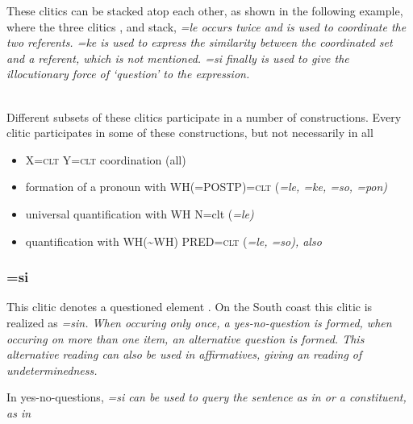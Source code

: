 These clitics can be stacked atop each other, as shown in the following example, where the three  clitics ,  and  stack, \em =le \em occurs twice and is used to coordinate the two referents. \em =ke \em is used to express the similarity between the coordinated set and a referent, which is not mentioned. \em =si \em finally is used to give the illocutionary force of `question' to the expression. 


 \\
Different subsets of these clitics participate in a number of constructions. Every clitic participates in some of these constructions, but not necessarily in all

\begin{itemize}\label{page:list:morph:clt}
 \item  X=\textsc{clt} Y=\textsc{clt} coordination (all)
 \item formation of a pronoun with WH(=POSTP)=\textsc{clt} (\em =le, =ke, =so, =pon\em) 
\item  universal quantification with WH N=clt (\em =le\em)  
 \item  quantification with WH(\~{}WH) PRED=\textsc{clt} (\em =le, =so\em), also 
\end{itemize}


\subsubsection{=si}\label{sec:morph:=si}
This clitic denotes a questioned element \citep[50]{Jayasuriya2002}. On the South coast this clitic is realized as \em =sin\em \citep{Slomanson2008ismil}. When occuring only once, a yes-no-question is formed, when occuring on more than one item, an alternative question is formed. This alternative reading can also be used in affirmatives, giving an reading of undeterminedness.
 
In yes-no-questions, \em =si \em can be used to query the sentence as  in  or  a constituent, as in 

